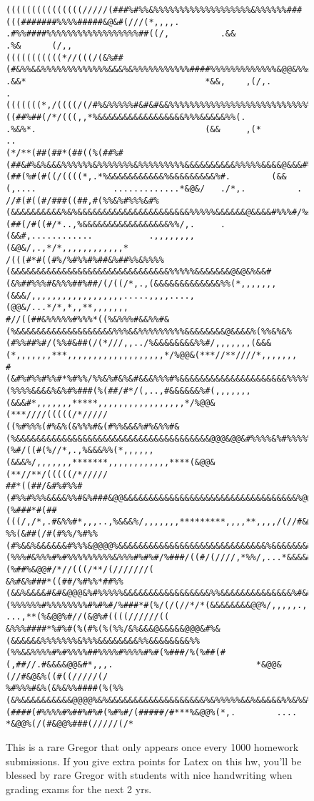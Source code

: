 \documentclass[a4paper, 20pt,fleqn]{article}
\begin{document}
\begin{figure}
\begin{verbatim}
(((((((((((((((/////(###%#%%&%%%%%%%%%%%%%%%%%%%&%%%%%%###(((#######%%%%#####&@&#(///(*,,,,. .#%%####%%%%%%%%%%%%%%%%%%##((/,          .&&                                    .%&      (/,,          
(((((((((((*//(((/(&%##(#&%%&&%%%%%%%%%%%%%&&&%&%%%%%%%%%%%####%%%%%%%%%%%%%&@@&%%###////((*,*%%%%&&&&&&&&&&&&&&&&&&&&&&%&&%%%*        .&&*                                   *&&,    ,(/,.        . 
(((((((*,/((((/(/#%&%%%%%#&#&#&&%%%%%%%%%%%%%%%%%%%%%%%%%%%%%%%%%%%&%%%%%%%&&@&&&((##%##(/*/(((,,*%&&&&&&&&&&&&&&&&&%%%&&&&&%%(.       .%&%*.                                 (&&     ,(*          ..
(*/**(##(##*(##((%(##%#(##&#%&%&&&%%%%%%&%%%%%%%&%%%%%%%%%&&&&&&&&&&%%%%%&&&&@&&&#%&(##(%#(#((/((((*,.*%&&&&&&&&&&&%&&&&&&&&&%#.        (&&(,....               .............*&@&/   ./*,.          .
//#(#((#/###((##,#(%%&%#%%%&#%(&&&&&&&&&&%&%&&&&&&&&&&&&&&&&&&&&&&%%%%%&&&&&&@&&&&#%%%#/%#%%%(##(/#((#/*..,%&&&&&&&&&&&&&&&&&%%/,.     .(&&#,............           .,,,,,,,,(&@&/,.,*/*,,,,,,,,,,,,*
/(((#*#((#%/%#%%#%##&%##%%&%%%%(&&&&&&&&&&&&&&&&&&&&&&&&&&&&&&&%%%%%&&&&&&&@&@&%&&#(&%##%%%#&%%%##%##/(/((/*,.,(&&&&&&&&&&&&&%%(*,,,,,,,(&&&/,,,,,,,,,,,,,,,,,,.....,,,,....,(@@&/...*/*,*,,**,,,,,,,
#//((##&%%%%%#%%%*((%&%%%#&&%%#&(%&&&&&&&&&&&&&&&&&&&%%%&&%%%%%%%%%&&&&&&&&@&&&&%(%%&%&%(#%%##%#/(%%#&##(/(*///,,../%&&&&&&&&%%#/,,,,,,,(&&&(*,,,,,,,***,,,,,,,,,,,,,,,,,,,*/%@@&(***//**////*,,,,,,,
#(&#%#%%#%%#*%#%%/%%&%#&%&#&&&%%%#%&&&&&&&&&&&&&&&&&&&&&%%%%%%%%&&&&&&&&&&@@&&&%%#%%&%&%(%%%%&&&&%&%#%###(%(##/#*/(,..,#&&&&&&%#(,,,,,,,(&&&#*,,,,,,,*****,,,,,,,,,,,,,,,,,*/%@@&(***////(((((/*/////
((%#%%%(#%&%(&%%%#&(#%%&&&%#%&%%#&(%&&&&&&&&&&&&&&&&&&&&&&&&&&&&&&&&&&&&&&@@@&@@&#%%%%&%#%%%%%&%&%%##%#%%/#(%#/((#(%//*,.,%&&&%%(*,,,,,,(&&&%/,,,,,,,*******,,,,,,,,,,,,****(&@@&(**//**/(((((/*/////
##*((##/&#%#%%#(#%%#%%%&&&&%%#&%###&@@&&&&&&&&&&&&&&&&&&&&&&&&&&&&&&&&&&%@@&&&@@&%&&%%%%%%#%&%%%%#%#%&%%#(%###*#(##(((/,/*,.#&%%#*,,,..,%&&&%/,,,,,,,*********,,,,**,,,,/(//#&@@%/**/***////(//*////(
%%(&##(/#(#%%/%#%%(#%&&%&&&&&&#%%%&@@@@%&&&&&&&&&&&&&&&&&&&&&&&&&&&&&%&&&&&&&&&&(%%%#&%%%#%#%%%%%%%%%&%%%#%#%#/%###/((#/(////,*%%/,...*&&&&&#*,,,,,,,,..,,,,,,*******,,*(%##%&@@#/*//(((/**/(///////(
&%#&%###*((##/%#%%*##%%(&&%&&&&#&#&@@@&%#%%%%%&&&&&&&&&&&&&&&&&%%&&&&&&&&&&&&&&%#&&&%&%%%(%%%%%%#%%%%%%%%#%#%#/%###*#(%/(/(//*/*(&&&&&&&&@@%/,,,,,.,                 ...,**(%&@@%#//(&@%#((((//////((
&%%%####*%#%#(%(#%(%(%%/&%&&&@&&&&&@@@&#%&(&&&&&&%%%%%%%&%%%&&&&&&&&%%&&&&&&&&%%(%%&&%%%%#%#%%%%##%%%%#%%%%#%#(%###/%(%##(#(,##//.#&&&&@@&#*,,,.                            *&@@&(//#&@&%((#((/////(/
%#%%%#&%(&%&%%####(%(%%(&%&&&&&&&&&&@@@@%&%&&&&&&&&&&&&&&&&&&&%&%%%%%&&%&&&&&%%&%&%&&%%%%%#%%#%%(####(#%%%%#%##%#%#(%#%#/(#####/#***%&@@%(*,.        ....                   *&@@%(/(#&@@%###(/////(/*
\end{verbatim}
\caption{This is a rare Gregor that only appears once every 1000 homework submissions. If you give extra points for Latex on this hw, you'll be blessed by rare Gregor with students with nice handwriting when grading exams for the next 2 yrs.}
\label{fig:ascii-box}
\end{figure}
\end{document}
